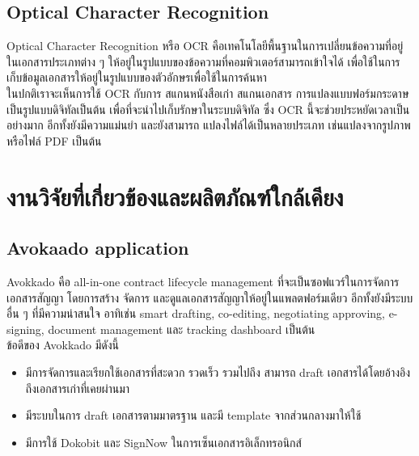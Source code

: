 \documentclass[12pt,oneside,openright,a4paper]{cpe-thai-project}
\begin{document}
\subsection{Optical Character Recognition}
\hspace*{1cm} Optical Character Recognition หรือ OCR \cite{WhatIsOCR} คือเทคโนโลยีพื้นฐานในการเปลี่ยนข้อความที่อยู่ในเอกสารประเภทต่าง ๆ ให้อยู่ในรูปแบบของข้อความที่คอมพิวเตอร์สามารถเข้าใจได้ เพื่อใช้ในการเก็บข้อมูลเอกสารให้อยู่ในรูปแบบของตัวอักษรเพื่อใช้ในการค้นหา \\
\hspace*{1cm} ในปกติเราจะเห็นการใช้ OCR กับการ สแกนหนังสือเก่า สแกนเอกสาร การแปลงแบบฟอร์มกระดาษเป็นรูปแบบดิจิทัลเป็นต้น เพื่อที่จะนำไปเก็บรักษาในระบบดิจิทัล ซึ่ง OCR นี้จะช่วยประหยัดเวลาเป็นอย่างมาก อีกทั้งยังมีความแม่นยำ และยังสามารถ แปลงไฟล์ได้เป็นหลายประเภท เช่นแปลงจากรูปภาพ หรือไฟล์ PDF เป็นต้น



\section{งานวิจัยที่เกี่ยวข้องและผลิตภัณฑ์ใกล้เคียง}
\subsection{Avokaado application}
\hspace*{1cm} Avokkado \cite{BestDMS,WhatIsAvokaado} คือ all-in-one contract lifecycle management ที่จะเป็นซอฟแวร์ในการจัดการเอกสารสัญญา โดยการสร้าง จัดการ และดูแลเอกสารสัญญาให้อยู่ในแพลตฟอร์มเดียว อีกทั้งยังมีระบบอื่น ๆ ที่มีความน่าสนใจ อาทิเช่น smart drafting, co-editing, negotiating approving, e-signing, document management และ tracking dashboard เป็นต้น \\
\hspace*{1cm} ข้อดีของ Avokkado มีดังนี้
\begin{itemize}
  \item มีการจัดการและเรียกใช้เอกสารที่สะดวก รวดเร็ว รวมไปถึง สามารถ draft เอกสารได้โดยอ้างอิงถึงเอกสารเก่าที่เคยผ่านมา
  \item มีระบบในการ draft เอกสารตามมาตรฐาน และมี template จากส่วนกลางมาให้ใช้
  \item มีการใช้ Dokobit และ SignNow ในการเซ็นเอกสารอิเล็กทรอนิกส์
\end{itemize}
\end{document}
